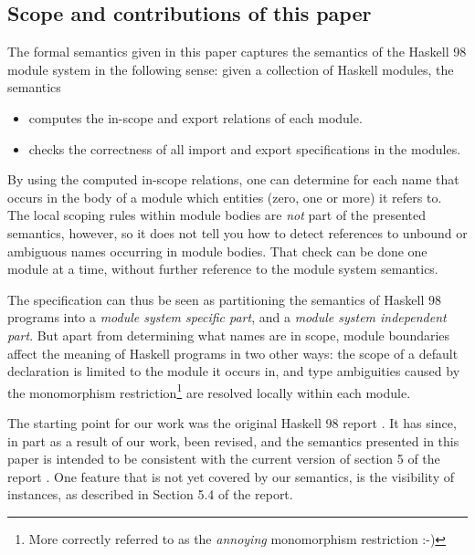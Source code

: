 \subsection{Scope and contributions of this paper}

The formal semantics given in this paper captures the semantics of the
Haskell 98 module system in the following sense: given a collection of
Haskell modules, the semantics

\begin{itemize}

\item computes the in-scope and export relations of each module.

\item checks the correctness of all import and export specifications in
      the modules.

\end{itemize}

By using the computed in-scope relations, one can determine
for each name that occurs in the body of a module which
entities (zero, one or more) it refers to.
The local scoping rules within module bodies are
{\em not} part of the presented semantics, however, so it does not
tell you how to detect references to unbound or ambiguous names occurring
in module bodies. That check can be done one module at a time, without further
reference to the module system semantics.

The specification can thus be seen as partitioning the semantics of
Haskell 98 programs into a {\em module system specific part}, and a
{\em module system independent part}.  But apart from determining what
names are in scope, module boundaries affect the meaning of Haskell
programs in two other ways: the scope of a {\iden default} declaration
is limited to the module it occurs in, and type ambiguities caused by
the monomorphism restriction\footnote{More correctly referred to
    as the {\em annoying} monomorphism restriction :-)}
are resolved locally within each module.

The starting point for our work was the original Haskell 98 report
\cite{Haskell98old}.  It has since, in part as a result of
our work, been revised, and the semantics presented in this paper is
intended to be consistent with the current version of section 5 of the
report \cite{Haskell98}.  One feature that is not yet covered by our
semantics, is the visibility of instances, as described in Section 5.4
of the report.

